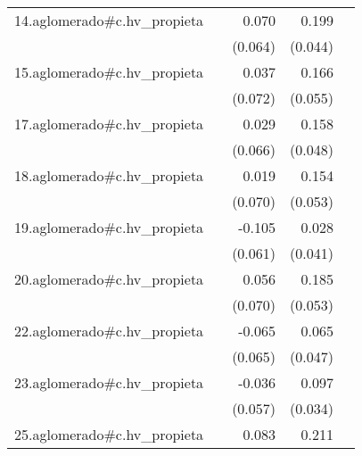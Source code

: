 {\begin{longtable}{l*{4}{D{.}{.}{-1}}}
\addlinespace
14.aglomerado#c.hv\_propieta&                     &       0.070         &       0.199\sym{***}&                     \\
            &                     &     (0.064)         &     (0.044)         &                     \\
\addlinespace
15.aglomerado#c.hv\_propieta&                     &       0.037         &       0.166\sym{**} &                     \\
            &                     &     (0.072)         &     (0.055)         &                     \\
\addlinespace
17.aglomerado#c.hv\_propieta&                     &       0.029         &       0.158\sym{***}&                     \\
            &                     &     (0.066)         &     (0.048)         &                     \\
\addlinespace
18.aglomerado#c.hv\_propieta&                     &       0.019         &       0.154\sym{**} &                     \\
            &                     &     (0.070)         &     (0.053)         &                     \\
\addlinespace
19.aglomerado#c.hv\_propieta&                     &      -0.105         &       0.028         &                     \\
            &                     &     (0.061)         &     (0.041)         &                     \\
\addlinespace
20.aglomerado#c.hv\_propieta&                     &       0.056         &       0.185\sym{***}&                     \\
            &                     &     (0.070)         &     (0.053)         &                     \\
\addlinespace
22.aglomerado#c.hv\_propieta&                     &      -0.065         &       0.065         &                     \\
            &                     &     (0.065)         &     (0.047)         &                     \\
\addlinespace
23.aglomerado#c.hv\_propieta&                     &      -0.036         &       0.097\sym{**} &                     \\
            &                     &     (0.057)         &     (0.034)         &                     \\
\addlinespace
25.aglomerado#c.hv\_propieta&                     &       0.083         &       0.211\sym{***}&                     \\

\end{longtable}}
